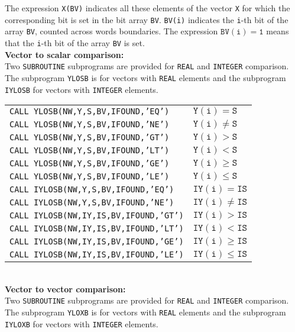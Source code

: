 The expression {\tt X(BV)} indicates all these elements of
the vector {\tt X} for which the corresponding bit is set in
the bit array {\tt BV}. {\tt BV(i)} indicates the {\tt i}-th bit of the
array {\tt BV}, counted across words boundaries. The expression
$\mathtt{BV(i)=1}$ means that the {\tt i}-th bit of the array {\tt BV}
is set. \\[3mm]
{\bf Vector to scalar comparison:} \\[3mm]
Two {\tt SUBROUTINE} subprograms are provided for
{\tt REAL} and {\tt INTEGER} comparison. The subprogram {\tt YLOSB}
is for vectors with {\tt REAL} elements and the subprogram
{\tt IYLOSB} for vectors with {\tt INTEGER} elements. \\[3mm]
\begin{tabular}{@{\hspace*{5mm}}l@{\qquad $\mathtt{BV(i)=1}$ \ if \ }l}
{\tt CALL YLOSB(NW,Y,S,BV,IFOUND,'EQ')} & $\mathtt{Y(i) = S}$ \\
{\tt CALL YLOSB(NW,Y,S,BV,IFOUND,'NE')} & $\mathtt{Y(i) \ne S}$ \\
{\tt CALL YLOSB(NW,Y,S,BV,IFOUND,'GT')} & $\mathtt{Y(i) > S}$ \\
{\tt CALL YLOSB(NW,Y,S,BV,IFOUND,'LT')} & $\mathtt{Y(i) < S}$ \\
{\tt CALL YLOSB(NW,Y,S,BV,IFOUND,'GE')} & $\mathtt{Y(i) \ge S}$ \\
{\tt CALL YLOSB(NW,Y,S,BV,IFOUND,'LE')} & $\mathtt{Y(i) \le S}$ \\
{\tt CALL IYLOSB(NW,Y,S,BV,IFOUND,'EQ')} & $\mathtt{IY(i) = IS}$ \\
{\tt CALL IYLOSB(NW,Y,S,BV,IFOUND,'NE')} & $\mathtt{IY(i) \ne IS}$ \\
{\tt CALL IYLOSB(NW,IY,IS,BV,IFOUND,'GT')} & $\mathtt{IY(i) > IS}$ \\
{\tt CALL IYLOSB(NW,IY,IS,BV,IFOUND,'LT')} & $\mathtt{IY(i) < IS}$ \\
{\tt CALL IYLOSB(NW,IY,IS,BV,IFOUND,'GE')} & $\mathtt{IY(i) \ge IS}$ \\
{\tt CALL IYLOSB(NW,IY,IS,BV,IFOUND,'LE')} & $\mathtt{IY(i) \le IS}$
\end{tabular} \\[3mm]
{\bf Vector to vector comparison:} \\[3mm]
Two {\tt SUBROUTINE} subprograms are provided for
{\tt REAL} and {\tt INTEGER} comparison. The subprogram {\tt YLOXB}
is for vectors with {\tt REAL} elements and the subprogram
{\tt IYLOXB} for vectors with {\tt INTEGER} elements. \\[3mm]

